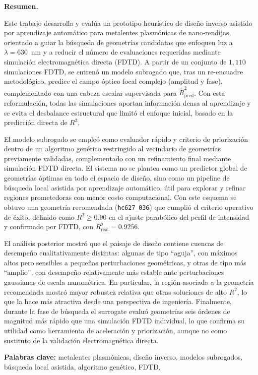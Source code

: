 \noindent\textbf{Resumen.}

Este trabajo desarrolla y evalúa un prototipo heurístico de diseño inverso asistido por aprendizaje automático para metalentes plasmónicas de nano-rendijas, orientado a guiar la búsqueda de geometrías candidatas que enfoquen luz a $\lambda = 630$~nm y a reducir el número de evaluaciones requeridas mediante simulación electromagnética directa (FDTD). A partir de un conjunto de $1{,}110$ simulaciones FDTD, se entrenó un modelo subrogado que, tras un re-encuadre metodológico, predice el campo óptico focal complejo (amplitud y fase), complementado con una cabeza escalar supervisada para $\hat{R}^2_{\text{pred}}$. Con esta reformulación, todas las simulaciones aportan información densa al aprendizaje y se evita el desbalance estructural que limitó el enfoque inicial, basado en la predicción directa de $R^2$.

El modelo subrogado se empleó como evaluador rápido y criterio de priorización dentro de un algoritmo genético restringido al vecindario de geometrías previamente validadas, complementado con un refinamiento final mediante simulación FDTD directa. El sistema no se plantea como un predictor global de geometrías óptimas en todo el espacio de diseño, sino como un pipeline de búsqueda local asistida por aprendizaje automático, útil para explorar y refinar regiones prometedoras con menor costo computacional. Con este esquema se obtuvo una geometría recomendada (\texttt{hc627\_036}) que cumplió el criterio operativo de éxito, definido como $R^2 \geq 0.90$ en el ajuste parabólico del perfil de intensidad y confirmado por FDTD, con $R^2_{\text{real}} = 0.9256$.

El análisis posterior mostró que el paisaje de diseño contiene cuencas de desempeño cualitativamente distintas: algunas de tipo ``aguja'', con máximos altos pero sensibles a pequeñas perturbaciones geométricas, y otras de tipo más ``amplio'', con desempeño relativamente más estable ante perturbaciones gaussianas de escala nanométrica. En particular, la región asociada a la geometría recomendada mostró mayor robustez relativa que otras soluciones de alto $R^2$, lo que la hace más atractiva desde una perspectiva de ingeniería. Finalmente, durante la fase de búsqueda el surrogate evaluó geometrías seis órdenes de magnitud más rápido que una simulación FDTD individual, lo que confirma su utilidad como herramienta de aceleración y priorización, aunque no como sustituto de la validación electromagnética directa.


\vspace{0.5em}
\noindent\textbf{Palabras clave:} metalentes plasmónicas, diseño inverso, modelos subrogados, búsqueda local asistida, algoritmo genético, FDTD.
